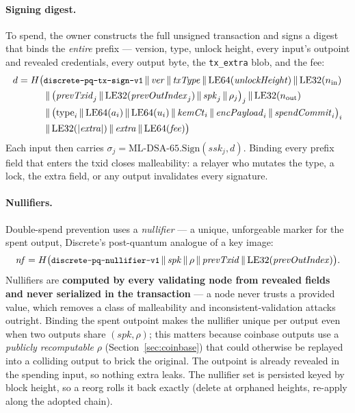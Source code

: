 \documentclass[11pt,a4paper]{article}
\newcommand{\code}[1]{\texttt{\small #1}}
\newcommand{\DSA}{\mathrm{ML\text{-}DSA\text{-}65}}
\newcommand{\concat}{\,\|\,}
\begin{document}
\paragraph{Signing digest.}
To spend, the owner constructs the full unsigned transaction and signs a
digest that binds the \emph{entire} prefix --- version, type, unlock height,
every input's outpoint and revealed credentials, every output byte, the
\code{tx\_extra} blob, and the fee:
\begin{equation}
\begin{split}
d = H\bigl(&\text{\code{discrete-pq-tx-sign-v1}} \concat \mathit{ver}
 \concat \mathit{txType} \concat \mathrm{LE64}(\mathit{unlockHeight})
 \concat \mathrm{LE32}(n_{\mathrm{in}}) \\
&\concat \bigl(\mathit{prevTxid}_j \concat \mathrm{LE32}(\mathit{prevOutIndex}_j)
 \concat \mathit{spk}_j \concat \rho_j\bigr)_{j}
 \concat \mathrm{LE32}(n_{\mathrm{out}}) \\
&\concat \bigl(\mathrm{type}_i \concat \mathrm{LE64}(a_i)
 \concat \mathrm{LE64}(u_i) \concat \mathit{kemCt}_i
 \concat \mathit{encPayload}_i \concat \mathit{spendCommit}_i\bigr)_{i} \\
&\concat \mathrm{LE32}(|\mathit{extra}|) \concat \mathit{extra}
 \concat \mathrm{LE64}(\mathit{fee})\bigr)
\end{split}
\label{eq:digest}
\end{equation}
Each input then carries $\sigma_j = \DSA.\mathrm{Sign}(\mathit{ssk}_j, d)$.
Binding every prefix field that enters the txid closes malleability: a
relayer who mutates the type, a lock, the extra field, or any output
invalidates every signature.

\paragraph{Nullifiers.}
Double-spend prevention uses a \emph{nullifier} --- a unique, unforgeable
marker for the spent output, Discrete's post-quantum analogue of a key image:
\begin{equation}
\mathit{nf} = H\bigl(\text{\code{discrete-pq-nullifier-v1}} \concat
\mathit{spk} \concat \rho \concat \mathit{prevTxid} \concat
\mathrm{LE32}(\mathit{prevOutIndex})\bigr).
\label{eq:nullifier}
\end{equation}
Nullifiers are \textbf{computed by every validating node from revealed
fields and never serialized in the transaction} --- a node never trusts a
provided value, which removes a class of malleability and
inconsistent-validation attacks outright. Binding the spent outpoint makes
the nullifier unique per output even when two outputs share
$(\mathit{spk}, \rho)$; this matters because coinbase outputs use a
\emph{publicly recomputable} $\rho$ (Section~\ref{sec:coinbase}) that could
otherwise be replayed into a colliding output to brick the original. The
outpoint is already revealed in the spending input, so nothing extra leaks.
The nullifier set is persisted keyed by block height, so a reorg rolls it
back exactly (delete at orphaned heights, re-apply along the adopted chain).
\end{document}
